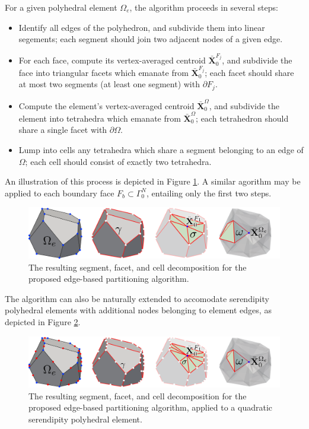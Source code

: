 	For a given polyhedral element $\Omega_e$, the algorithm proceeds in several steps:
	\begin{itemize}
		\item[1.)] Identify all edges of the polyhedron, and subdivide them into linear segements; each segment should join two adjacent nodes of a given edge.
		\item[2.)] For each face, compute its vertex-averaged centroid $\bar{\mathbf{X}}^{F_j}_0$, and subdivide the face into triangular facets which emanate from $\bar{\mathbf{X}}^{F_j}_0$; each facet should share at most two segments (at least one segment) with $\partial F_j$.
		\item[3a.)] Compute the element's vertex-averaged centroid $\bar{\mathbf{X}}^{\Omega}_0$, and subdivide the element into tetrahedra which emanate from $\bar{\mathbf{X}}^{\Omega}_0$; each tetrahedron should share a single facet with $\partial \Omega$.
		\item[3b.)] Lump into cells any tetrahedra which share a segment belonging to an edge of $\Omega$; each cell should consist of exactly two tetrahedra.
	\end{itemize}
	An illustration of this process is depicted in Figure \ref{fig:partitioning_algorithm}. A similar agorithm may be applied to each boundary face $F_b \subset \Gamma^N_0$, entailing only the first two steps. 
	\begin{figure} [!ht]
		\centering
		\includegraphics[width = 6.0in]{figures/partitioning_algorithm.pdf}
		\caption{The resulting segment, facet, and cell decomposition for the proposed edge-based partitioning algorithm.}
		\label{fig:partitioning_algorithm}
	\end{figure}
	
	The algorithm can also be naturally extended to accomodate serendipity polyhedral elements with additional nodes belonging to element edges, as depicted in Figure \ref{fig:partitioning_algorithm_quadratic}.
	\begin{figure} [!ht]
		\centering
		\includegraphics[width = 6.0in]{figures/partitioning_algorithm_quadratic.pdf}
		\caption{The resulting segment, facet, and cell decomposition for the proposed edge-based partitioning algorithm, applied to a quadratic serendipity polyhedral element.}
		\label{fig:partitioning_algorithm_quadratic}
	\end{figure}

